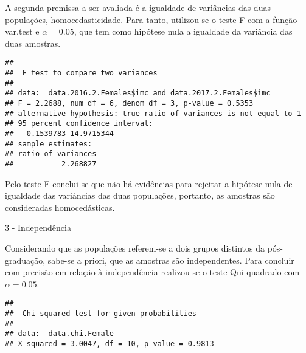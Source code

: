 \documentclass[]{article}
\newenvironment{Shaded}{\begin{snugshade}}{\end{snugshade}}
\newcommand{\DecValTok}[1]{\textcolor[rgb]{0.00,0.00,0.81}{#1}}
\newcommand{\FloatTok}[1]{\textcolor[rgb]{0.00,0.00,0.81}{#1}}
\newcommand{\KeywordTok}[1]{\textcolor[rgb]{0.13,0.29,0.53}{\textbf{#1}}}
\newcommand{\NormalTok}[1]{#1}
\newcommand{\OperatorTok}[1]{\textcolor[rgb]{0.81,0.36,0.00}{\textbf{#1}}}
\newcommand{\StringTok}[1]{\textcolor[rgb]{0.31,0.60,0.02}{#1}}
\begin{document}
A segunda premissa a ser avaliada é a igualdade de variâncias das duas
populações, homocedasticidade. Para tanto, utilizou-se o teste F com a
função var.test e \(\alpha = 0.05\), que tem como hipótese nula a
igualdade da variância das duas amostras.

\begin{Shaded}
\end{Shaded}

\begin{verbatim}
## 
##  F test to compare two variances
## 
## data:  data.2016.2.Females$imc and data.2017.2.Females$imc
## F = 2.2688, num df = 6, denom df = 3, p-value = 0.5353
## alternative hypothesis: true ratio of variances is not equal to 1
## 95 percent confidence interval:
##   0.1539783 14.9715344
## sample estimates:
## ratio of variances 
##           2.268827
\end{verbatim}

Pelo teste F conclui-se que não há evidências para rejeitar a hipótese
nula de igualdade das variâncias das duas populações, portanto, as
amostras são consideradas homocedásticas.

3 - Independência

Considerando que as populações referem-se a dois grupos distintos da
pós-graduação, sabe-se a priori, que as amostras são independentes. Para
concluir com precisão em relação à independência realizou-se o teste
Qui-quadrado com \(\alpha = 0.05\).

\begin{Shaded}
\end{Shaded}

\begin{verbatim}
## 
##  Chi-squared test for given probabilities
## 
## data:  data.chi.Female
## X-squared = 3.0047, df = 10, p-value = 0.9813
\end{verbatim}
\end{document}

